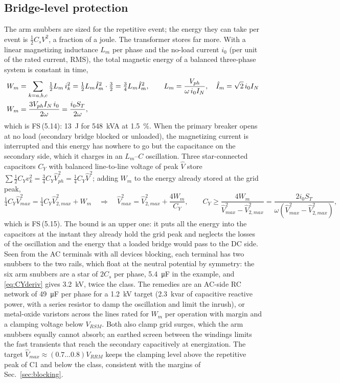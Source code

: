 \documentclass[10pt,a4paper]{scrartcl}
\newcommand{\VRRM}{V_{RRM}}
\newcommand{\VRSM}{V_{RSM}}
\newcommand{\fs}[1]{\textsf{FS}\,(#1)}
\begin{document}
\subsection{Bridge-level protection}\label{sec:bridge}
The arm snubbers are sized for the repetitive event; the energy they can take per event is $\tfrac12C_sV^2$, a fraction of a joule. The transformer stores far more. With a linear magnetizing inductance $L_m$ per phase and the no-load current $i_0$ (per unit of the rated current, RMS), the total magnetic energy of a balanced three-phase system is constant in time,
\begin{align}
W_m &= \sum_{k=a,b,c}\tfrac12L_m\,i_k^2 = \tfrac12L_m\hat I_m^2\cdot\tfrac32 = \tfrac34L_m\hat I_m^2, \qquad
L_m = \frac{V_{ph}}{\omega\,i_0I_N}, \quad \hat I_m = \sqrt2\,i_0I_N \notag\\
W_m &= \frac{3V_{ph}I_N\,i_0}{2\omega} = \frac{i_0S_T}{2\omega} ,
\label{eq:Wmderiv}
\end{align}
which is \fs{5.14}: \SI{13}{J} for \SI{548}{kVA} at \SI{1.5}{\percent}. When the primary breaker opens at no load (secondary bridge blocked or unloaded), the magnetizing current is interrupted and this energy has nowhere to go but the capacitance on the secondary side, which it charges in an $L_m$--$C$ oscillation. Three star-connected capacitors $C_Y$ with balanced line-to-line voltage of peak $\hat V$ store $\sum\tfrac12C_Yv_k^2 = \tfrac34C_Y\hat V_{ph}^2 = \tfrac14C_Y\hat V^2$; adding $W_m$ to the energy already stored at the grid peak,
\begin{equation}
\tfrac14C_Y\hat V_{max}^2 = \tfrac14C_Y\hat V_{2,max}^2 + W_m
\quad\Rightarrow\quad
\hat V_{max}^2 = \hat V_{2,max}^2 + \frac{4W_m}{C_Y}, \qquad
C_Y \ge \frac{4W_m}{\hat V_{max}^2 - \hat V_{2,max}^2} = \frac{2i_0S_T}{\omega(\hat V_{max}^2 - \hat V_{2,max}^2)} ,
\label{eq:CYderiv}
\end{equation}
which is \fs{5.15}. The bound is an upper one: it puts all the energy into the capacitors at the instant they already hold the grid peak and neglects the losses of the oscillation and the energy that a loaded bridge would pass to the DC side. Seen from the AC terminals with all devices blocking, each terminal has two snubbers to the two rails, which float at the neutral potential by symmetry: the six arm snubbers are a star of $2C_s$ per phase, \SI{5.4}{\micro F} in the example, and \eqref{eq:CYderiv} gives \SI{3.2}{kV}, twice the class. The remedies are an AC-side RC network of \SI{49}{\micro F} per phase for a \SI{1.2}{kV} target (\SI{2.3}{kvar} of capacitive reactive power, with a series resistor to damp the oscillation and limit the inrush), or metal-oxide varistors across the lines rated for $W_m$ per operation with margin and a clamping voltage below $\VRSM$. Both also clamp grid surges, which the arm snubbers equally cannot absorb; an earthed screen between the windings limits the fast transients that reach the secondary capacitively at energization. The target $\hat V_{max}\approx(0.7\ldots0.8)\VRRM$ keeps the clamping level above the repetitive peak of C1 and below the class, consistent with the margins of Sec.~\ref{sec:blocking}.
\end{document}
